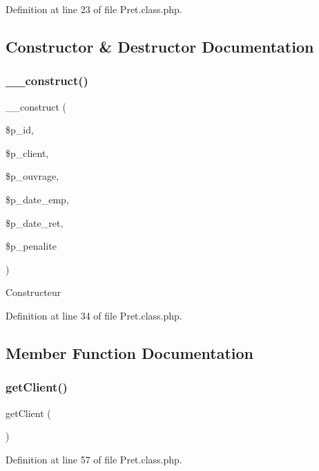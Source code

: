 Definition at line 23 of file Pret.\+class.\+php.



\subsection{Constructor \& Destructor Documentation}
\mbox{\label{class_pret_aff90a1966dd0404d05a530676aec0472}} 
\subsubsection{\texorpdfstring{\+\_\+\+\_\+construct()}{\_\_construct()}}
{\footnotesize\ttfamily \+\_\+\+\_\+construct (\begin{DoxyParamCaption}\item[{}]{\$p\+\_\+id,  }\item[{}]{\$p\+\_\+client,  }\item[{}]{\$p\+\_\+ouvrage,  }\item[{}]{\$p\+\_\+date\+\_\+emp,  }\item[{}]{\$p\+\_\+date\+\_\+ret,  }\item[{}]{\$p\+\_\+penalite }\end{DoxyParamCaption})}

Constructeur 

Definition at line 34 of file Pret.\+class.\+php.



\subsection{Member Function Documentation}
\mbox{\label{class_pret_a2f5f44fdf5404c87cc3a7b5719d85306}} 
\subsubsection{\texorpdfstring{get\+Client()}{getClient()}}
{\footnotesize\ttfamily get\+Client (\begin{DoxyParamCaption}{ }\end{DoxyParamCaption})}



Definition at line 57 of file Pret.\+class.\+php.

